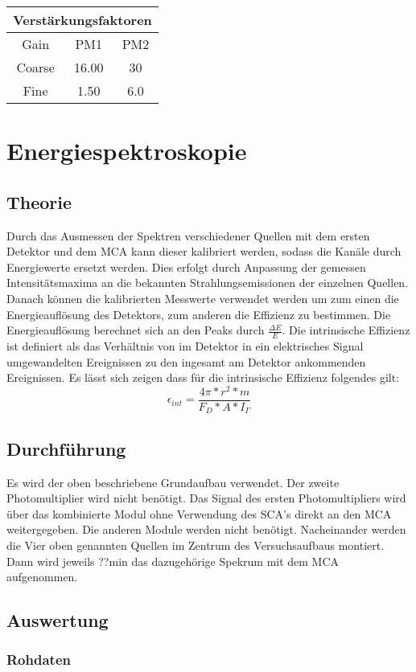 \documentclass{../Misc/MontavonLaTeX/Montavon}
\begin{document}
\begin{tabular}{|c|c|c|}
\hline 
\multicolumn{3}{|c|}{Verstärkungsfaktoren }\tabularnewline
\hline 
Gain & PM1 & PM2 \tabularnewline
\hline 
Coarse  & 16.00 & 30\tabularnewline
\hline 
Fine & 1.50 & 6.0\tabularnewline
\hline 
\end{tabular}


\section{Energiespektroskopie}
\subsection{Theorie}
Durch das Ausmessen der Spektren verschiedener Quellen mit dem ersten Detektor und dem MCA kann dieser kalibriert werden, sodass die Kanäle durch Energiewerte ersetzt werden. Dies erfolgt durch Anpassung der gemessen Intensitätsmaxima an die bekannten Strahlungsemissionen der einzelnen Quellen. Danach können die kalibrierten Messwerte verwendet werden um zum einen die Energieauflösung des Detektors, zum anderen die Effizienz zu bestimmen. Die Energieauflösung berechnet sich an den Peaks durch $\frac{\Delta E}{E}$. 
Die intrinsische Effizienz ist definiert als das Verhältnis von im Detektor in ein elektrisches Signal umgewandelten Ereignissen zu den ingesamt am Detektor ankommenden Ereignissen. Es lässt sich zeigen dass für die intrinsische Effizienz folgendes gilt:
$$\epsilon_{int} = \frac{4\pi*r^{2}*m}{F_{D}*A*I_{\Gamma}}$$
	

\subsection{Durchführung}
Es wird der oben beschriebene Grundaufbau verwendet. Der zweite Photomultiplier wird nicht benötigt. Das Signal des ersten Photomultipliers wird über das kombinierte Modul ohne Verwendung des SCA's direkt an den MCA weitergegeben. Die anderen Module werden nicht benötigt. 
Nacheinander werden die Vier oben genannten Quellen im Zentrum des Versuchsaufbaus montiert. Dann wird jeweils ??min das dazugehörige Spekrum mit dem MCA aufgenommen. 

\subsection{Auswertung}
\subsubsection{Rohdaten}
\end{document}
